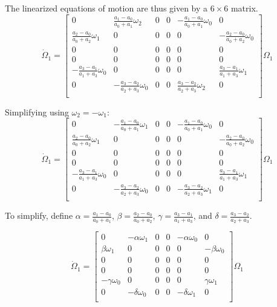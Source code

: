 \documentclass{article}
\begin{document}
The linearized equations of motion are thus given by a \(6 \times 6\) matrix.
\[\dot\Omega_1 = \begin{bmatrix}
    0 & \frac{a_1 - a_0}{a_0 + a_1}\omega_2 & 0 & 0 & -\frac{a_1 - a_0}{a_0 + a_1}\omega_0 & 0 \\
    \frac{a_2 - a_0}{a_0 + a_2}\omega_1 & 0 & 0 & 0 & 0 & -\frac{a_2 - a_0}{a_0 + a_2}\omega_0 \\
    0 & 0 & 0 & 0 & 0 & 0 \\
    0 & 0 & 0 & 0 & 0 & 0 \\
    -\frac{a_3 - a_1}{a_1 + a_3}\omega_0 & 0 & 0 & 0 & 0 & \frac{a_3 - a_1}{a_1 + a_3}\omega_1 \\
    0 & -\frac{a_3 - a_2}{a_2 + a_3}\omega_0 & 0 & 0 & \frac{a_3 - a_2}{a_2 + a_3}\omega_2 & 0 \\
\end{bmatrix}\Omega_1\]

Simplifying using \(\omega_2 = -\omega_1\):
\[\dot\Omega_1 = \begin{bmatrix}
    0 & -\frac{a_1 - a_0}{a_0 + a_1}\omega_1 & 0 & 0 & -\frac{a_1 - a_0}{a_0 + a_1}\omega_0 & 0 \\
    \frac{a_2 - a_0}{a_0 + a_2}\omega_1 & 0 & 0 & 0 & 0 & -\frac{a_2 - a_0}{a_0 + a_2}\omega_0 \\
    0 & 0 & 0 & 0 & 0 & 0 \\
    0 & 0 & 0 & 0 & 0 & 0 \\
    -\frac{a_3 - a_1}{a_1 + a_3}\omega_0 & 0 & 0 & 0 & 0 & \frac{a_3 - a_1}{a_1 + a_3}\omega_1 \\
    0 & -\frac{a_3 - a_2}{a_2 + a_3}\omega_0 & 0 & 0 & -\frac{a_3 - a_2}{a_2 + a_3}\omega_1 & 0 \\
\end{bmatrix}\Omega_1\]

To simplify, define \(\alpha = \frac{a_1 - a_0}{a_0 + a_1}\), \(\beta = \frac{a_2 - a_0}{a_0 + a_2}\), \(\gamma = \frac{a_3 - a_1}{a_1 + a_3}\), and \(\delta = \frac{a_3 - a_2}{a_2 + a_3}\).

\[\dot\Omega_1 = \begin{bmatrix}
    0 & -\alpha\omega_1 & 0 & 0 & -\alpha\omega_0 & 0 \\
    \beta\omega_1 & 0 & 0 & 0 & 0 & -\beta\omega_0 \\
    0 & 0 & 0 & 0 & 0 & 0 \\
    0 & 0 & 0 & 0 & 0 & 0 \\
    -\gamma\omega_0 & 0 & 0 & 0 & 0 & \gamma\omega_1 \\
    0 & -\delta\omega_0 & 0 & 0 & -\delta\omega_1 & 0 \\
\end{bmatrix}\Omega_1\]
\end{document}
